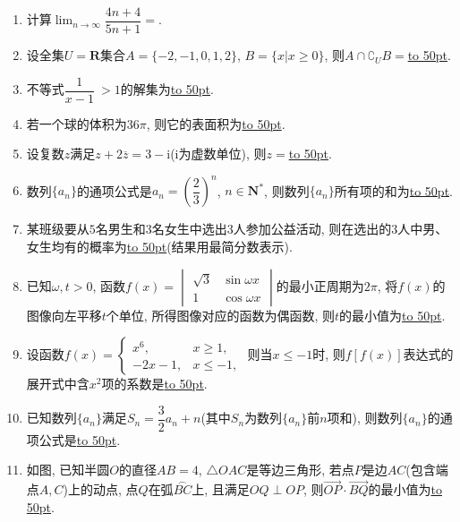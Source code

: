 \documentclass[10pt,a4paper]{article}
\newcommand{\blank}[1]{\underline{\hbox to #1pt{}}}
\begin{document}
\begin{enumerate}[1.]
\item 计算$\displaystyle \lim_{n\to\infty}\dfrac{4n+4}{5n+1}=$.
\item 设全集$U=\mathbf{R}$集合$A=\{-2,-1,0,1,2\}$, $B=\{x|x\ge 0\}$, 则$A\cap \complement_UB=$\blank{50}.
\item 不等式$\dfrac 1{x-1}\ >1$的解集为\blank{50}.
\item 若一个球的体积为$36\pi$, 则它的表面积为\blank{50}.
\item 设复数$z$满足$z+2\overline z=3-\mathrm{i}$($\mathrm{i}$为虚数单位), 则$z=$\blank{50}.
\item 数列$\{a_n\}$的通项公式是$a_n=(\dfrac 23)^n$, $n\in \mathbf{N}^*$, 则数列$\{a_n\}$所有项的和为\blank{50}.
\item 某班级要从$5$名男生和$3$名女生中选出$3$人参加公益活动, 则在选出的$3$人中男、女生均有的概率为\blank{50}(结果用最简分数表示).
\item 已知$\omega,t>0$, 函数$f(x)=\begin{vmatrix}
\sqrt 3 & \sin \omega x  \\ 1  & \cos \omega x  \end{vmatrix}$的最小正周期为$2\pi$, 将$f(x)$的图像向左平移$t$个单位, 所得图像对应的函数为偶函数, 则$t$的最小值为\blank{50}.
\item 设函数$f(x)=\begin{cases} x^6, &  x\ge 1,  \\ -2x-1, &  x\le -1,  \end{cases}$ 则当$x\le -1$时, 则$f[f(x)]$表达式的展开式中含$x^2$项的系数是\blank{50}.
\item 已知数列$\{a_n\}$满足$S_n=\dfrac32a_n+n$(其中$S_n$为数列$\{a_n\}$前$n$项和), 则数列$\{a_n\}$的通项公式是\blank{50}.
\item 如图, 已知半圆$O$的直径$AB=4$, $\triangle OAC$是等边三角形, 若点$P$是边$AC$(包含端点$A,C$)上的动点, 点$Q$在弧$\overset\frown{BC}$上, 且满足$OQ\perp OP$, 则$\overrightarrow{OP}\cdot \overrightarrow{BQ}$的最小值为\blank{50}.
\begin{center}
\end{center}
\end{enumerate}
\end{document}
